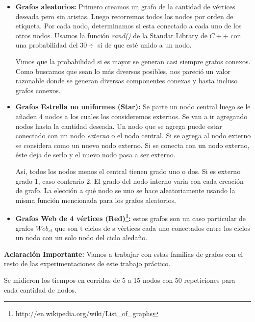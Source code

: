 \begin{itemize}
\item \textbf{Grafos aleatorios:} \quad Primero creamos un grafo de la cantidad de vértices deseada pero sin aristas. Luego recorremos todos los nodos por orden de etiqueta. Por cada nodo, determinamos si esta conectado a cada uno de los otros nodos. Usamos la función \textit{rand()} de la Standar Library de $C++$ con una probabilidad del $ 30\div $ si de que esté unido a un nodo. 

 \quad Vimos que la probabilidad si es mayor se generan casi siempre grafos conexos. Como buscamos que sean lo más diversos posibles, nos pareció un valor razonable donde se generan diversas componentes conexas y hasta incluso grafos conexos.

\quad

\item \textbf{Grafos Estrella no uniformes (Star):} \quad Se parte un nodo central luego se le añaden 4 nodos a los cuales los consideremos externos. Se van a ir agregando nodos hasta la cantidad deseada. Un nodo que se agrega puede estar conectado con un nodo \textit{externo} o el nodo central. Si se agrega al nodo externo se considera como un nuevo nodo externo. Si se conecta con un nodo externo, éste deja de serlo y el nuevo nodo pasa a ser externo. 

\quad Así, todos los nodos menos el central tienen grado uno o dos. Si es externo grado 1, caso contrario 2. El grado del nodo interno varia con cada creación de grafo. La elección a qué nodo se uno se hace aleatoriamente usando la misma función mencionada para los grafos aleatorios.

\quad

\item \textbf{Grafos Web de 4 vértices (Red)\footnote{http://en.wikipedia.org/wiki/List\_of\_graphs}:} \quad estos grafos son un caso particular de grafos $ Web_{s t} $ que son t ciclos de s vértices cada uno conectados entre los ciclos un nodo con un solo nodo del ciclo aledaño. 
\end{itemize}

\quad

\quad \textbf{Aclaración Importante:} Vamos a trabajar con estas familias de grafos con el resto de las experimentaciones de este trabajo práctico. 

\quad 

\quad Se midieron los tiempos en corridas de  5 a 15 nodos con 50 repeticiones para cada cantidad de nodos.

